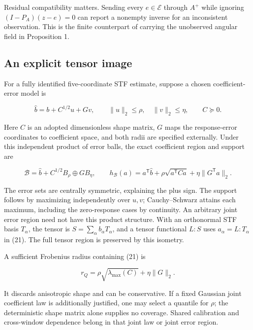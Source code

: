 \documentclass[aps,prd,reprint,onecolumn,11pt,nofootinbib,notitlepage]{revtex4-2}
\begin{document}
Residual compatibility matters. Sending every \(e\in\mathcal E\) through \(A^+\) while ignoring \((I-P_A)(z-e)=0\) can report a nonempty inverse for an inconsistent observation. This is the finite counterpart of carrying the unobserved angular field in Proposition 1.

\subsection{An explicit tensor image}

For a fully identified five-coordinate STF estimate, suppose a chosen coefficient-error model is

\begin{equation}
 \widehat b=b+C^{1/2}u+Gv,\qquad
 \|u\|_2\le\rho,\quad \|v\|_2\le\eta,\qquad C\succeq0.\tag{20}
\end{equation}

Here \(C\) is an adopted dimensionless shape matrix, \(G\) maps the response-error coordinates to coefficient space, and both radii are specified externally. Under this independent product of error balls, the exact coefficient region and support are

\begin{equation}
 \mathcal B=\widehat b+C^{1/2}B_\rho\oplus GB_\eta,
 \qquad h_{\mathcal B}(a)=a^{\mathsf T}\widehat b
 +\rho\sqrt{a^{\mathsf T}Ca}+\eta\|G^{\mathsf T}a\|_2 .\tag{21}
\end{equation}

The error sets are centrally symmetric, explaining the plus sign. The support follows by maximizing independently over \(u,v\); Cauchy--Schwarz attains each maximum, including the zero-response cases by continuity. An arbitrary joint error region need not have this product structure. With an orthonormal STF basis \(T_\alpha\), the tensor is \(S=\sum_\alpha b_\alpha T_\alpha\), and a tensor functional \(L:S\) uses \(a_\alpha=L:T_\alpha\) in (21). The full tensor region is preserved by this isometry.

A sufficient Frobenius radius containing (21) is

\begin{equation}
 r_Q=\rho\sqrt{\lambda_{\max}(C)}+\eta\|G\|_2.\tag{22}
\end{equation}

It discards anisotropic shape and can be conservative. If a fixed Gaussian joint coefficient law is additionally justified, one may select a quantile for \(\rho\); the deterministic shape matrix alone supplies no coverage. Shared calibration and cross-window dependence belong in that joint law or joint error region.
\end{document}
